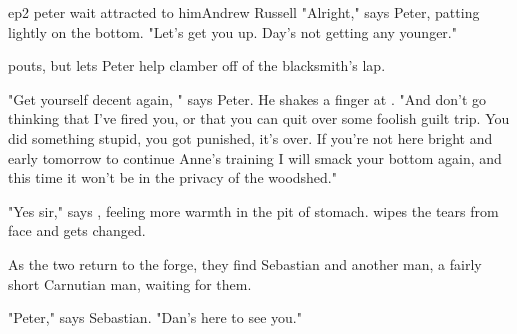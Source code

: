 \documentclass{book}
\begin{document}
\begin{childnode}{ep2 peter wait attracted to him}{Andrew Russell}
    "Alright," says Peter, patting \name{} lightly on the bottom. "Let's get you up. Day's not getting any younger."

    \name{} pouts, but lets Peter help \himher{} clamber off of the blacksmith's lap. 

    "Get yourself decent again, " says Peter. He shakes a finger at \name{}. "And don't go thinking that I've fired you, or that you can quit over some foolish guilt trip.
    You did something stupid, you got punished, it's over. If you're not here bright and early tomorrow to continue Anne's training I will smack your bottom again, and this time it won't be in the 
    privacy of the woodshed."

    "Yes sir," says \name{}, feeling more warmth in the pit of \hisher{} stomach. \HeShe{} wipes the tears from \hisher{} face and gets changed.

    As the two return to the forge, they find Sebastian and another man, a fairly short Carnutian man, waiting for them.

    "Peter," says Sebastian. "Dan's here to see you."


\end{childnode}
\end{document}
